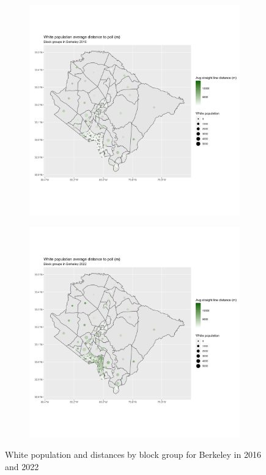 \documentclass[11pt]{article}
\theoremstyle{remark}
\theoremstyle{definition}
\begin{document}
\begin{figure}
	\begin{subfigure}{.5\textwidth}
		\centering
		\includegraphics[width=\linewidth]{result_analysis/Berkeley_County_SC_original_configs/white_pop_and_dist_Berkeley_config_original_2016_polls.png}
		\label{sfig:York_2016_bg_dist_pop}
	\end{subfigure} 
	\begin{subfigure}{.5\textwidth}
		\centering
		\includegraphics[width=\linewidth]{result_analysis/Berkeley_County_SC_original_configs/white_pop_and_dist_Berkeley_config_original_2022_polls.png}
		\label{sfig:Berkeley_2022_bg_dist}
	\end{subfigure}
	\caption{White population and distances by block group for Berkeley in 2016 and 2022}
	\label{fig:Berkeley distance White population maps}
\end{figure}
\end{document}
